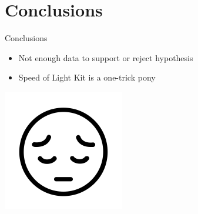 \documentclass{beamer}
\begin{document}
\section{Conclusions}
\begin{frame}{Conclusions}
  \begin{itemize}
    \item Not enough data to support or reject hypothesis
    \item Speed of Light Kit is a one-trick pony
  \end{itemize}
  \begin{center}
    \includegraphics[height=0.6\textheight]{pensive-emoji.png}
  \end{center}
\end{frame}
\end{document}
